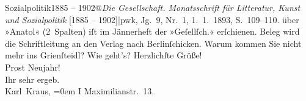 \begin{ledgroupsized}[t]{13cm}
{{{{                  Sozialpolitik1885 – 1902@\emph{Die Gesellschaft. Monatsschrift für Litteratur, Kunst und Sozialpolitik} {[}1885 – 1902{]}|pwk}, Jg. 9, Nr. 1, 1. 1. 1893,
                     S. 109–110.}}}\label{K_L00150_1h} über »Anatol«
               (2 Spalten) iſt im Jännerheft der »Geſellſch.«
               erſchienen. Beleg wird die Schriftleitung an den Verlag nach Berlinſchicken. Warum kommen Sie nicht mehr ins Grienſteidl? Wie geht’s?\pend
           \pstart
           Herzlichſte Grüße!{\\[\baselineskip]}Prost Neujahr!{\\[\baselineskip]}Ihr sehr ergeb.{\\[\baselineskip]}\spacefill\mbox{Karl Kraus,}\pend
           \leftskip=0em{}\pstart
           \noindent{}I Maximilianstr. 13.\pend
           
         
         \endnumbering{}\end{ledgroupsized}  \newcommand{\dateiname}{L00150}\newcommand{\titel}{Karl Kraus an Arthur Schnitzler, 31. 12. 1892}\newcommand{\editorInnen}{Martin Anton Müller und Gerd-Hermann Susen}
      